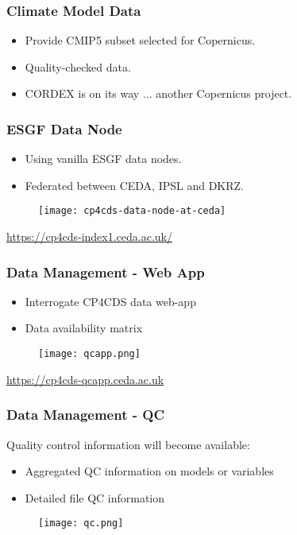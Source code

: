 \documentclass{beamer}
\begin{document}
\begin{frame}
\frametitle<presentation>{Climate Model Data}

  \begin{itemize}
    \item Provide CMIP5 subset selected for Copernicus.
    \item Quality-checked data.
    \item CORDEX is on its way ... another Copernicus project.
  \end{itemize}

\end{frame}

\begin{frame}
\frametitle<presentation>{ESGF Data Node}

  \begin{itemize}
    \item Using vanilla ESGF data nodes.
    \item Federated between CEDA, IPSL and DKRZ.
  \end{itemize}

  \begin{figure}[ht]
    \centering
    \texttt{[image: cp4cds-data-node-at-ceda]}
  \end{figure}

  \centering
  \footnotesize{\url{https://cp4cds-index1.ceda.ac.uk/}}

\end{frame}

\begin{frame}
\frametitle<presentation>{Data Management - Web App}
  \begin{itemize}
    \item Interrogate CP4CDS data web-app
    \item Data availability matrix
  \end{itemize}

  \begin{figure}[ht]
    \centering
    \texttt{[image: qcapp.png]}
  \end{figure}

  \centering
  \footnotesize{\url{https://cp4cds-qcapp.ceda.ac.uk}}


\end{frame}

\begin{frame}
\frametitle<presentation>{Data Management - QC}
  Quality control information will become available:
  \begin{itemize}
    \item Aggregated QC information on models or variables
    \item Detailed file QC information
  \end{itemize}

  \begin{figure}[ht]
    \centering
    \texttt{[image: qc.png]}
  \end{figure}

\end{frame}
\end{document}
